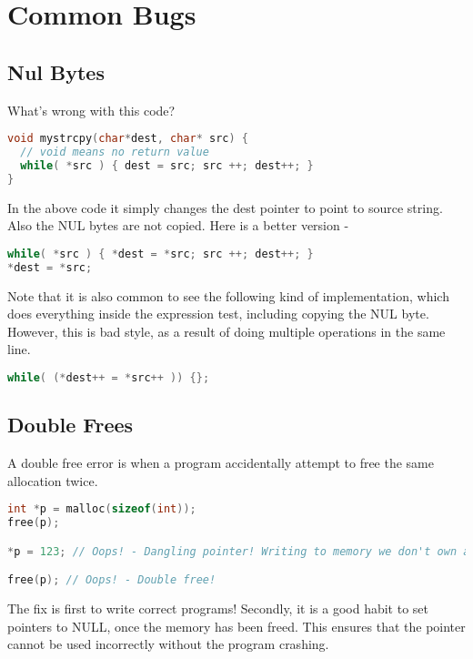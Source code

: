 \section{Common Bugs}

\subsection{Nul Bytes}

What's wrong with this code?

\begin{lstlisting}[language=C]
void mystrcpy(char*dest, char* src) {
  // void means no return value
  while( *src ) { dest = src; src ++; dest++; }
}
\end{lstlisting}

In the above code it simply changes the dest pointer to point to source string.
Also the NUL bytes are not copied.
Here is a better version -

\begin{lstlisting}[language=C]
while( *src ) { *dest = *src; src ++; dest++; }
*dest = *src;
\end{lstlisting}

Note that it is also common to see the following kind of implementation, which does everything inside the expression test, including copying the NUL byte.
However, this is bad style, as a result of doing multiple operations in the same line.

\begin{lstlisting}[language=C]
while( (*dest++ = *src++ )) {};
\end{lstlisting}

\subsection{Double Frees}

A double free error is when a program accidentally attempt to free the same allocation twice.

\begin{lstlisting}[language=C]
int *p = malloc(sizeof(int));
free(p);

*p = 123; // Oops! - Dangling pointer! Writing to memory we don't own anymore

free(p); // Oops! - Double free!
\end{lstlisting}

The fix is first to write correct programs!
Secondly, it is a good habit to set pointers to NULL, once the memory has been freed.
This ensures that the pointer cannot be used incorrectly without the program crashing.

